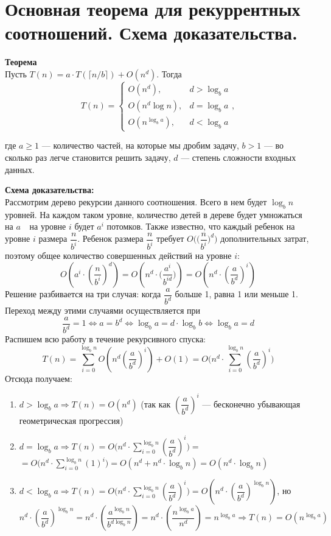 \section{Основная теорема для рекуррентных соотношений. Схема доказательства.}

\textbf{Теорема\\}
 Пусть $T(n)=a\cdot T(\lceil n/b\rceil)+O(n^d)$. Тогда
$$
T(n)=\begin{cases}O(n^d), &d>\log_ba\\O(n^d\log n), &d=\log_ba\\O(n^{\log_ba}), &d<\log_ba\end{cases},
$$

где $a \ge 1$ --- количество частей, на которые мы дробим задачу, $b>1$ --- во сколько раз легче становится решить задачу, $d$ --- степень сложности входных данных.



\textbf{Схема доказательства:}\\
Рассмотрим дерево рекурсии данного соотношения. Всего в нем будет $\log_bn$ уровней. На каждом таком уровне, количество детей в дереве будет умножаться на $a$ $\>$~на уровне $i$ будет $a^i$ потомков. Также известно, что каждый ребенок на уровне $i$ размера $\dfrac{n}{b^i}$. Ребенок размера $\dfrac{n}{b^i}$ требует $O\bigg(\Big(\dfrac{n}{b^i}\Big)^d\bigg)$ дополнительных затрат, поэтому общее количество совершенных действий на уровне $i$: $$O\left(a^i\cdot\left(\frac{n}{b^i}\right)^d\right)=O\left(n^d\cdot\Big(\frac{a^i}{b^{id}}\Big)\right)=O\left(n^d\cdot\left(\frac{a}{b^d}\right)^i\right)$$
Решение разбивается на три случая: когда $\dfrac{a}{b^d}$ больше 1, равна 1 или меньше 1. Переход между этими случаями осуществляется при
$$\frac{a}{b^d}=1\Leftrightarrow a=b^d\Leftrightarrow\log_ba=d\cdot\log_bb\Leftrightarrow\log_ba=d$$
Распишем всю работу в течение рекурсивного спуска:
$$T(n)=\sum\limits_{i=0}^{\log_bn}O\left(n^d\left(\frac{a}{b^d}\right)^i\right)+O(1)=O\Bigg(n^d\cdot\sum\limits_{i=0}^{\log_bn}\left(\frac{a}{b^d}\right)^i\Bigg)$$
Отсюда получаем:
\begin{enumerate}
	\item $d>\log_ba\Rightarrow T(n)=O(n^d)$ (так как $\left(\dfrac{a}{b^d}\right)^i$ --- бесконечно убывающая геометрическая прогрессия)
	\item $d=\log_ba\Rightarrow T(n)=O\Bigg(n^d\cdot\sum\limits_{i=0}^{\log_bn}\left(\dfrac{a}{b^d}\right)^i\Bigg)=$\\
	$=O\Bigg(n^d\cdot\sum\limits_{i=0}^{\log_bn}\left(1\right)^i\Bigg)=O(n^d+n^d\cdot\log_bn)=O(n^d\cdot\log_bn)$
	\item $d<\log_ba\Rightarrow T(n)=O\Bigg(n^d\cdot\sum\limits_{i=0}^{\log_bn}\left(\dfrac{a}{b^d}\right)^i\Bigg)=O\left(n^d\cdot\left(\dfrac{a}{b^d}\right)^{\log_bn}\right)$, но $$n^d\cdot\left(\frac{a}{b^d}\right)^{\log_bn}=n^d\cdot\left(\frac{a^{\log_bn}}{b^{d\log_bn}}\right)=n^d\cdot\left(\frac{n^{\log_ba}}{n^d}\right)=n^{\log_ba}\Rightarrow T(n)=O(n^{\log_ba})$$
\end{enumerate}
